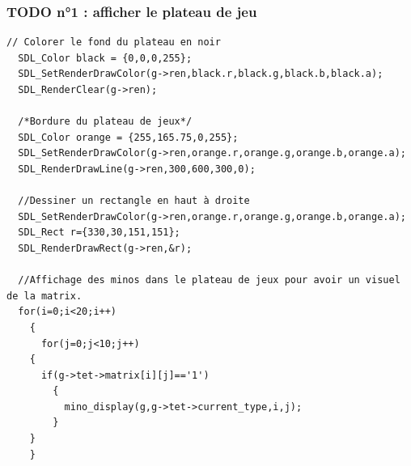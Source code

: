 \documentclass[a4paper,10p]{report}
\begin{document}
\subsubsection{TODO n°1 : afficher le plateau de jeu}
\label{todo1}
\begin{lstlisting}
// Colorer le fond du plateau en noir
  SDL_Color black = {0,0,0,255};
  SDL_SetRenderDrawColor(g->ren,black.r,black.g,black.b,black.a);
  SDL_RenderClear(g->ren);

  /*Bordure du plateau de jeux*/
  SDL_Color orange = {255,165.75,0,255};
  SDL_SetRenderDrawColor(g->ren,orange.r,orange.g,orange.b,orange.a);
  SDL_RenderDrawLine(g->ren,300,600,300,0);

  //Dessiner un rectangle en haut à droite
  SDL_SetRenderDrawColor(g->ren,orange.r,orange.g,orange.b,orange.a);
  SDL_Rect r={330,30,151,151};
  SDL_RenderDrawRect(g->ren,&r);

  //Affichage des minos dans le plateau de jeux pour avoir un visuel de la matrix.
  for(i=0;i<20;i++)
    {
      for(j=0;j<10;j++)
	{
	  if(g->tet->matrix[i][j]=='1')
	    {
	      mino_display(g,g->tet->current_type,i,j);
	    }
	}
    }
    

\end{lstlisting}
\end{document}
